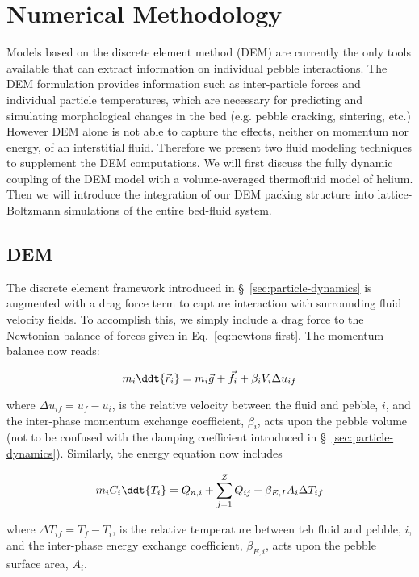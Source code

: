 \section{Numerical Methodology}
Models based on the discrete element method (DEM) are currently the only tools available that can extract information on individual pebble interactions. The DEM formulation provides information such as inter-particle forces and individual particle temperatures, which are necessary for predicting and simulating morphological changes in the bed (e.g. pebble cracking, sintering, etc.) However DEM alone is not able to capture the effects, neither on momentum nor energy, of an interstitial fluid. Therefore we present two fluid modeling techniques to supplement the DEM computations. We will first discuss the fully dynamic coupling of the DEM model with a volume-averaged thermofluid model of helium. Then we will introduce the integration of our DEM packing structure into lattice-Boltzmann simulations of the entire bed-fluid system.

\subsection{DEM}
The discrete element framework introduced in \S~\ref{sec:particle-dynamics} is augmented with a drag force term to capture interaction with surrounding fluid velocity fields. To accomplish this, we simply include a drag force to the Newtonian balance of forces given in Eq.~\ref{eq:newtons-first}. The momentum balance now reads:

\begin{equation}\label{eq:cfdem-dem-momentum}
	m_i  \ddt{\vec{r}_i} = m_i\vec{g} + \vec{f}_i + \beta_i V_i \Delta u_{if}
\end{equation}

where $\Delta u_{if} = u_f - u_i$, is the relative velocity between the fluid and pebble, $i$, and the inter-phase momentum exchange coefficient, $\beta_i$, acts upon the pebble volume (not to be confused with the damping coefficient introduced in \S~\ref{sec:particle-dynamics}). Similarly, the energy equation now includes 

\begin{equation}\label{eq:cfdem-dem-energy}
	m_iC_i \ddt{T_i} = Q_{n,i} + \sum_{j=1}^Z Q_{ij} + \beta_{E,I} A_i \Delta T_{if}
\end{equation}

where $\Delta T_{if} = T_f - T_i$, is the relative temperature between teh fluid and pebble, $i$, and the inter-phase energy exchange coefficient, $\beta_{E,i}$, acts upon the pebble surface area, $A_i$.

